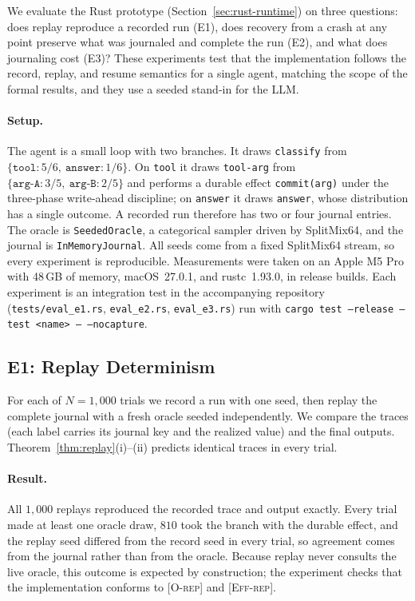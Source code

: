 
We evaluate the Rust prototype (Section~\ref{sec:rust-runtime}) on three questions:
does replay reproduce a recorded run (E1), does recovery from a crash at any point preserve
what was journaled and complete the run (E2), and what does journaling cost (E3)?
These experiments test that the implementation follows the record, replay, and resume
semantics for a single agent, matching the scope of the formal results, and they use a seeded
stand-in for the LLM.

\paragraph{Setup.}
The agent is a small loop with two branches.
It draws \texttt{classify} from $\{\texttt{tool}: 5/6,\ \texttt{answer}: 1/6\}$.
On \texttt{tool} it draws \texttt{tool-arg} from $\{\texttt{arg-A}: 3/5,\ \texttt{arg-B}: 2/5\}$
and performs a durable effect \texttt{commit(arg)} under the three-phase write-ahead
discipline; on \texttt{answer} it draws \texttt{answer}, whose distribution has a single
outcome.
A recorded run therefore has two or four journal entries.
The oracle is \texttt{SeededOracle}, a categorical sampler driven by SplitMix64, and the journal
is \texttt{InMemoryJournal}.
All seeds come from a fixed SplitMix64 stream, so every experiment is reproducible.
Measurements were taken on an Apple M5 Pro with 48\,GB of memory, macOS~27.0.1, and
rustc~1.93.0, in release builds.
Each experiment is an integration test in the accompanying repository
(\texttt{tests/eval\_e1.rs}, \texttt{eval\_e2.rs}, \texttt{eval\_e3.rs}) run with \texttt{cargo test --release --test <name> -- --nocapture}.

\subsection{E1: Replay Determinism}
\label{sec:eval-e1}

For each of $N = 1{,}000$ trials we record a run with one seed, then replay the complete
journal with a fresh oracle seeded independently.
We compare the traces (each label carries its journal key and the realized value) and the
final outputs.
Theorem~\ref{thm:replay}(i)--(ii) predicts identical traces in every trial.

\paragraph{Result.}
All $1{,}000$ replays reproduced the recorded trace and output exactly.
Every trial made at least one oracle draw, $810$ took the branch with the durable effect, and
the replay seed differed from the record seed in every trial, so agreement comes from the
journal rather than from the oracle.
Because replay never consults the live oracle, this outcome is expected by construction; the
experiment checks that the implementation conforms to \textsc{[O-rep]} and \textsc{[Eff-rep]}.

